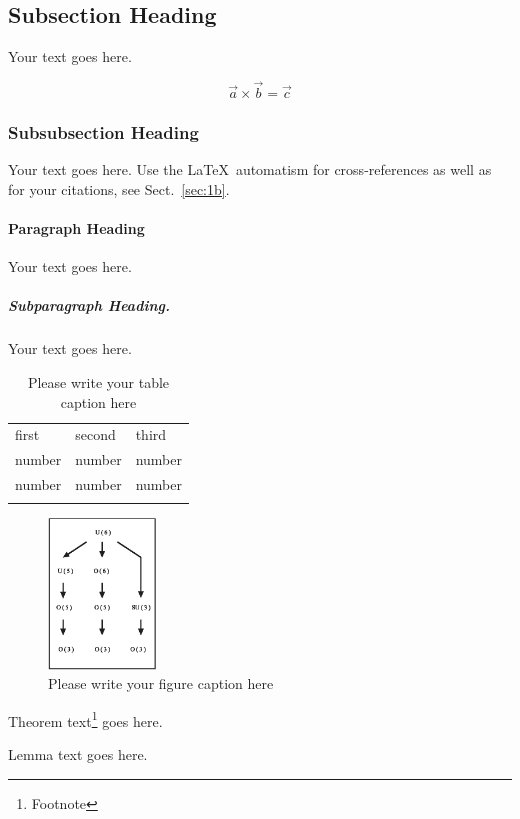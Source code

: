 \subsection{Subsection Heading}
\label{sec:2b}
Your text goes here.

\begin{equation}
\vec{a}\times\vec{b}=\vec{c}
\end{equation}

\subsubsection{Subsubsection Heading}
Your text goes here. Use the \LaTeX\ automatism for cross-references as
well as for your citations, see Sect.~\ref{sec:1b}.

\paragraph{Paragraph Heading} %
Your text goes here.

\subparagraph{Subparagraph Heading.} Your text goes here.%
%
%
%
\begin{table}
\center
\caption{Please write your table caption here}
\label{tab:1b}       %
%
%
\begin{tabular}{lll}
\hline\noalign{\smallskip}
first & second & third  \\
\noalign{\smallskip}\hline\noalign{\smallskip}
number & number & number \\
number & number & number \\
\noalign{\smallskip}\hline
\end{tabular}
\end{table}
%
%
%
\begin{figure}
\center
\includegraphics[height=4cm]{graphics/figure.eps}
%
%
\caption{Please write your figure caption here}
\label{fig:1b}       %
\end{figure}
%
%
\begin{theorem}
Theorem text\footnote{Footnote} goes here.
\end{theorem}
%
%
\begin{lemma}
Lemma text goes here.
\end{lemma}
%
%
% 
% 
%



%





